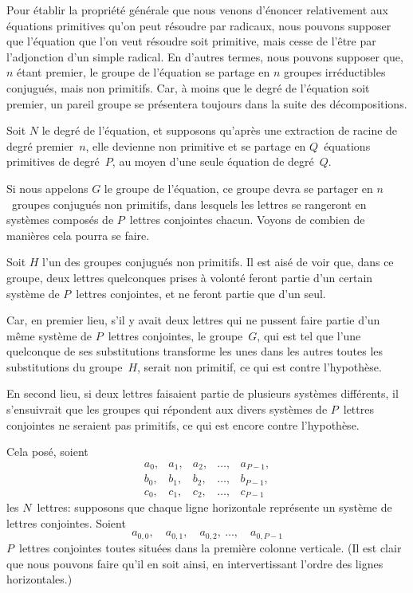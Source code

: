 \documentclass[leqno,12pt]{book}[2005/09/16]
\newcommand{\DPtypo}[2]{#2}
\begin{document}
Pour établir la propriété générale que nous venons d'énoncer
relativement aux équations primitives qu'on peut résoudre par
radicaux, nous pouvons supposer que l'équation que l'on veut
résoudre soit primitive, mais cesse de l'être par l'adjonction d'un
simple radical. En d'autres termes, nous pouvons supposer que,
$n$ étant premier, le groupe de l'équation se partage en $n$ groupes
irréductibles conjugués, mais non primitifs. Car, à moins que le
degré de l'équation soit premier, un pareil groupe se présentera
toujours dans la suite des décompositions.

Soit $N$ le degré de l'équation, et supposons qu'après une extraction
de racine de degré premier~$n$, elle devienne non primitive et
se partage en $Q$~équations primitives de degré~$P$, au moyen d'une
seule équation de degré~$Q$.

Si nous appelons $G$ le groupe de l'équation, ce groupe devra se
partager en $n$~groupes conjugués non primitifs, dans lesquels les
lettres se rangeront en systèmes composés de $P$~lettres conjointes
chacun. Voyons de combien de manières cela pourra se faire.

Soit $H$ l'un des groupes conjugués non primitifs. Il est aisé de
voir que, dans ce groupe, deux lettres quelconques prises à volonté
feront partie d'un certain système de $P$~lettres conjointes,
et ne feront partie que d'un seul.

Car, en premier lieu, s'il y avait deux lettres qui ne pussent
faire partie d'un même système de $P$~lettres conjointes, le groupe~$G$,
qui est tel que l'une quelconque de ses substitutions transforme
les unes dans les autres toutes les substitutions du groupe~$H$,
serait non primitif, ce qui est contre l'hypothèse.

En second lieu, si deux lettres faisaient partie de plusieurs
systèmes différents, il s'ensuivrait que les groupes qui répondent
aux divers systèmes de $P$~lettres conjointes ne seraient pas primitifs,
ce qui est encore contre l'hypothèse.

Cela posé, soient
\[
\begin{array}{*{5}{l}}
a_{0}, & a_{1}, & a_{2}, & \dots, & a_{P-1}, \\
b_{0}, & b_{1}, & b_{2}, & \dots, & b_{P-1}, \\
c_{0}, & c_{1}, & c_{2}, & \dots, & c_{P-1}
\end{array}
\]
les $N$~lettres: supposons que chaque ligne horizontale représente
un système de lettres conjointes. Soient
\[
\DPtypo{a_{0}}{a_{0,0}},\quad a_{0,1}, \quad a_{0,2}, \ \dots, \quad a_{0,P-1}
\]
$P$~lettres conjointes toutes situées dans la première colonne verticale.
(Il est clair que nous pouvons faire qu'il en soit ainsi, en
intervertissant l'ordre des lignes horizontales.)
\end{document}
